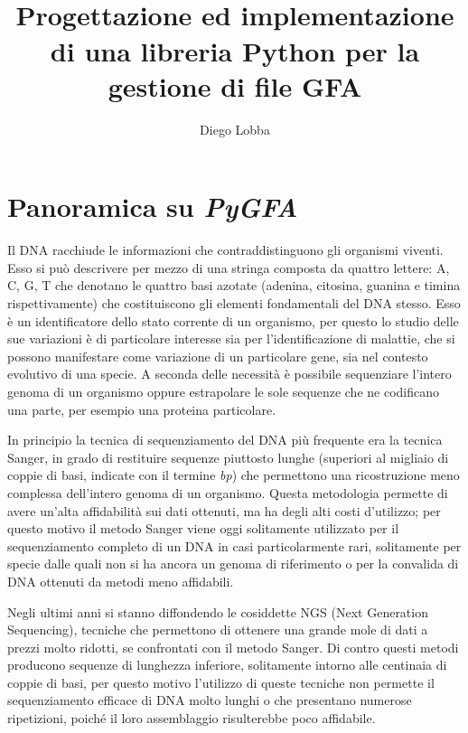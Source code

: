 \documentclass[11pt, a4paper]{book}
\title{\pygfa \\
	Progettazione ed implementazione di una libreria Python per la gestione
	di file GFA}
\author{Diego Lobba}
\newcommand {\pygfa} {\textit{PyGFA}}
\begin{document}


\tableofcontents
\listoffigures

\chapter{Panoramica su \pygfa}
\nocite{marx_2013}
Il DNA racchiude le informazioni che contraddistinguono gli organismi
viventi. Esso si può descrivere per mezzo di una stringa composta da quattro
lettere: A, C, G, T che denotano le quattro basi azotate (adenina, citosina,
guanina e timina rispettivamente) che costituiscono gli elementi
fondamentali del DNA stesso. Esso è un identificatore dello stato
corrente di un organismo, per questo lo studio delle sue variazioni
è di particolare interesse sia per l'identificazione di malattie,
che si possono manifestare come variazione di un particolare gene,
sia nel contesto evolutivo di una specie. A seconda delle necessità
è possibile sequenziare l'intero genoma di un organismo oppure estrapolare
le sole sequenze che ne codificano una parte, per esempio una proteina
particolare.

In principio la tecnica di sequenziamento del DNA più frequente era la tecnica
Sanger, in grado di restituire sequenze piuttosto lunghe (superiori al migliaio di
coppie di basi, indicate con il termine \emph{bp}) che permettono una ricostruzione
meno complessa dell'intero genoma di un organismo. Questa metodologia permette
di avere un'alta affidabilità sui dati ottenuti, ma ha degli alti costi d'utilizzo;
per questo motivo il metodo Sanger viene oggi solitamente utilizzato per
il sequenziamento completo di un DNA in casi particolarmente rari,
solitamente per specie dalle quali non si ha ancora un genoma di riferimento
o per la convalida di DNA ottenuti da metodi meno affidabili.

Negli ultimi anni si stanno diffondendo le cosiddette NGS (Next Generation Sequencing),
tecniche che permettono di ottenere una grande mole di dati
a prezzi molto ridotti, se confrontati con il metodo Sanger. Di contro questi
metodi producono sequenze di lunghezza inferiore, solitamente
intorno alle centinaia di coppie di basi, per questo motivo l'utilizzo di queste
tecniche non permette il sequenziamento efficace di DNA molto lunghi o che
presentano numerose ripetizioni, poiché il loro assemblaggio
risulterebbe poco affidabile.
\end{document}

